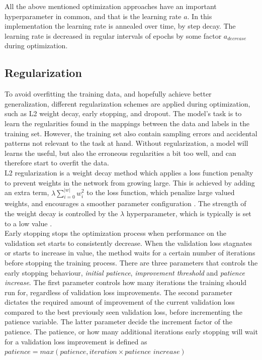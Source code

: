 All the above mentioned optimization approaches have an important hyperparameter in common, and that is the learning rate $a$. In this implementation the learning rate is annealed over time, by step decay. The learning rate is decreased in regular intervals of epochs by some factor $a_{decrease}$ during optimization. \\

\subsection{Regularization}
To avoid overfitting the training data, and hopefully achieve better generalization, different regularization schemes are applied during optimization, such as L2 weight decay, early stopping, and dropout. The model's task is to learn the regularities found in the mappings between the data and labels in the training set. However, the training set also contain sampling errors and accidental patterns not relevant to the task at hand. Without regularization, a model will learns the useful, but also the erroneous regularities a bit too well, and can therefore start to overfit the data. \\

L2 regularization is a weight decay method which applies a loss function penalty to prevent weights in the network from growing large. This is achieved by adding an extra term, $\lambda\sum_{i=0}^{|w|} w_i^2$ to the loss function, which penalize large valued weights, and encourages a smoother parameter configuration \citep{Hinton_regularization}. The strength of the weight decay is controlled by the $\lambda$ hyperparameter, which is typically is set to a low value .\\

Early stopping stops the optimization process when performance on the validation set starts to consistently decrease. When the validation loss stagnates or starts to increase in value, the method waits for a certain number of iterations before stopping the training process. There are three parameters that controls the early stopping behaviour, \textit{initial patience}, \textit{improvement threshold} and \textit{patience increase}. The first parameter controls how many iterations the training should run for, regardless of validation loss improvements. The second parameter dictates the required amount of improvement of the current validation loss compared to the best previously seen validation loss, before incrementing the patience variable. The latter parameter decide the increment factor of the patience. The patience, or how many additional iterations early stopping will wait for a validation loss improvement is defined as $\textit{patience} = max(\textit{patience}, \textit{iteration} \times \textit{patience increase} )$ \\

